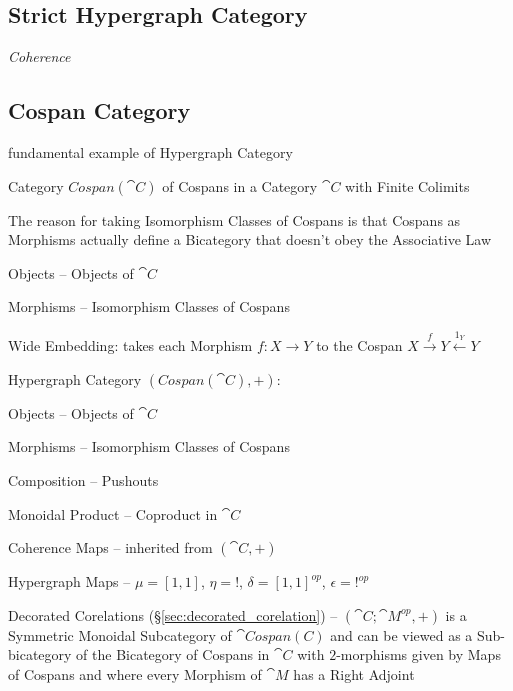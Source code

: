\subsection{Strict Hypergraph Category}
\label{sec:strict_hypergraph_category}

\emph{Coherence}



\subsection{Cospan Category}\label{sec:cospan_category}

fundamental example of Hypergraph Category

Category $Cospan(\cat{C})$ of Cospans in a Category $\cat{C}$ with
Finite Colimits

\fist The reason for taking Isomorphism Classes of Cospans is that
Cospans as Morphisms actually define a Bicategory that doesn't obey
the Associative Law %

Objects -- Objects of $\cat{C}$

Morphisms -- Isomorphism Classes of Cospans

Wide Embedding: takes each Morphism $f : X \rightarrow Y$ to the
Cospan $X \xrightarrow{f} Y \xleftarrow{1_Y} Y$

Hypergraph Category $(Cospan(\cat{C}), +)$:

Objects -- Objects of $\cat{C}$

Morphisms -- Isomorphism Classes of Cospans

Composition -- Pushouts

Monoidal Product -- Coproduct in $\cat{C}$

Coherence Maps -- inherited from $(\cat{C}, +)$

Hypergraph Maps -- $\mu = [1,1]$, $\eta = !$, $\delta = [1,1]^{op}$,
$\epsilon = !^{op}$

Decorated Corelations (\S\ref{sec:decorated_corelation}) --
$(\cat{C};\cat{M}^{op}, +)$ is a Symmetric Monoidal Subcategory of
$\cat{Cospan(C)}$ and can be viewed as a Sub-bicategory of the
Bicategory of Cospans in $\cat{C}$ with $2$-morphisms given by Maps of
Cospans and where every Morphism of $\cat{M}$ has a Right Adjoint

